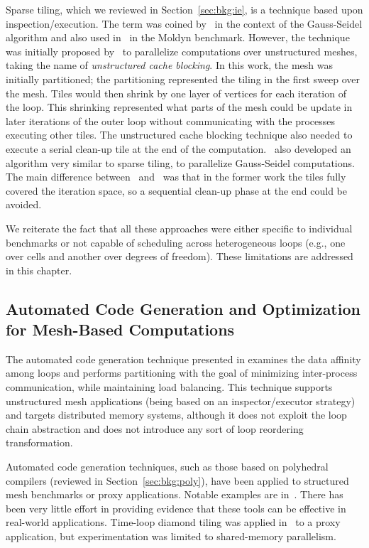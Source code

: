 Sparse tiling, which we reviewed in Section~\ref{sec:bkg:ie}, is a technique based upon inspection/execution. The term was coined by~\cite{ST-StroutLCPC2002,ST-StroutIJHPCA} in the context of the Gauss-Seidel algorithm and also used in~\cite{ST-StroutPLDI03} in the Moldyn benchmark. However, the technique was initially proposed by~\cite{ST-dimeEtna00} to parallelize computations over unstructured meshes, taking the name of \textit{unstructured cache blocking}. In this work, the mesh was initially partitioned; the partitioning represented the tiling in the first sweep over the mesh. Tiles would then shrink by one layer of vertices for each iteration of the loop. This shrinking represented what parts of the mesh could be update in later iterations of the outer loop without communicating with the processes executing other tiles. The unstructured cache blocking technique also needed to execute a serial clean-up tile at the end of the computation.~\cite{ST-Adams99c} also developed an algorithm very similar to sparse tiling, to parallelize Gauss-Seidel computations. The main difference between~\cite{ST-StroutLCPC2002,ST-StroutIJHPCA} and~\cite{ST-dimeEtna00} was that in the former work the tiles fully covered the iteration space, so a sequential clean-up phase at the end could be avoided. 

We reiterate the fact that all these approaches were either specific to individual benchmarks or not capable of scheduling across heterogeneous loops (e.g., one over cells and another over degrees of freedom). These limitations are addressed in this chapter.

\subsection*{Automated Code Generation and Optimization for Mesh-Based Computations}
The automated code generation technique presented in \cite{ST-OhioStateMPICodeGen} examines the data affinity among loops and performs partitioning with the goal of minimizing inter-process communication, while maintaining load balancing. This technique supports unstructured mesh applications (being based on an inspector/executor strategy) and targets distributed memory systems, although it does not exploit the loop chain abstraction and does not introduce any sort of loop reordering transformation.

Automated code generation techniques, such as those based on polyhedral compilers (reviewed in Section~\ref{sec:bkg:poly}), have been applied to structured mesh benchmarks or proxy applications. Notable examples are in~\cite{pluto,polly,loopy}. There has been very little effort in providing evidence that these tools can be effective in real-world applications. Time-loop diamond tiling was applied in~\cite{cohen-timetiling} to a proxy application, but experimentation was limited to shared-memory parallelism.


